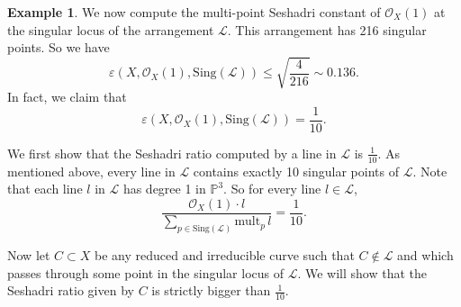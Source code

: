 \documentclass[12pt,reqno]{amsart}
\theoremstyle{plain}
\numberwithin{equation}{section}
\theoremstyle{definition}
\newtheorem{example}[theorem]{Example}
\begin{document}
\begin{example}


		
		We now compute the multi-point Seshadri constant of $\mathcal{O}_X(1)$ at the singular locus of 
		the arrangement $\mathcal{L}$.  This arrangement has 216 singular points. So we have 
		$$\varepsilon(X, \mathcal{O}_X(1), \text{Sing}(\mathcal{L})) \le \sqrt{\frac{4}{216}} \sim 0.136.$$
In fact, we claim that
		\[
		\varepsilon(X, \mathcal{O}_X(1), \text{Sing}(\mathcal{L})) = \frac{1}{10}.
		\]

  We first show that the Seshadri ratio computed by a line in $\mathcal{L}$ is $\frac{1}{10}$. 
   As mentioned above, every line in $\mathcal{L}$ contains exactly 10 singular points of $\mathcal{L}$. 
   Note that each line $l$ in $\mathcal{L}$ has degree 1 in $\mathbb{P}^3$.
   So for every line $l \in \mathcal{L}$, 
		\[
		\frac{\mathcal{O}_X(1)\cdot l}{ \sum\limits_{p \in\text{Sing}(\mathcal{L})} \text{mult}_{p} \,l} %
		= \frac{1}{10}.
		\]
  
		Now let $C \subset X$ be any reduced and irreducible curve such that $C \notin \mathcal{L}$ and which passes through some point in the singular locus of 
		$\mathcal{L}$. We will show that the Seshadri ratio given by $C$ is strictly bigger than $\frac{1}{10}$. 
  

\end{example}
\end{document}
